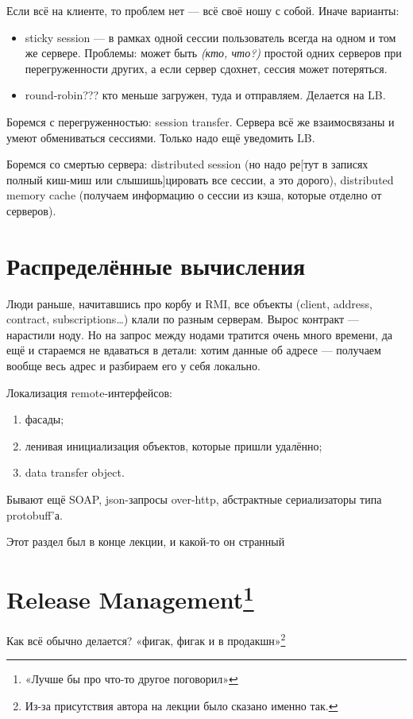 \documentclass[11pt,a4paper]{article}
\begin{document}
Если всё на клиенте, то проблем нет — всё своё ношу с собой. Иначе варианты:
\begin{itemize}
\item sticky session — в рамках одной сессии пользователь всегда на одном и том же сервере. Проблемы: может быть \textit{(кто, что?)} простой одних серверов при перегруженности других, а если сервер сдохнет, сессия может потеряться.
\item round-robin??? кто меньше загружен, туда и отправляем. Делается на LB.
\end{itemize}

Боремся с перегруженностью: session transfer. Сервера всё же взаимосвязаны и умеют обмениваться сессиями. Только надо ещё уведомить LB.

Боремся со смертью сервера: distributed session (но надо ре[тут в записях полный киш-миш или слышишь]цировать все сессии, а это дорого), distributed memory cache (получаем информацию о сессии из кэша, которые отделно от серверов).

\section{Распределённые вычисления}
Люди раньше, начитавшись про корбу и RMI, все объекты (client, address, contract, subscriptions…) клали по разным серверам. Вырос контракт — нарастили ноду. Но на запрос между нодами тратится очень много времени, да ещё и стараемся не вдаваться в детали: хотим данные об адресе — получаем вообще весь адрес и разбираем его у себя локально.

Локализация remote-интерфейсов:
\begin{enumerate}
\item фасады;
\item ленивая инициализация объектов, которые пришли удалённо;
\item data transfer object.
\end{enumerate}

Бывают ещё SOAP, json-запросы over-http, абстрактные сериализаторы типа protobuff'а.

Этот раздел был в конце лекции, и какой-то он странный

\section{Release Management\footnote{«Лучше бы про что-то другое поговорил»}}
Как всё обычно делается? «фигак, фигак и в продакшн»\footnote{Из-за присутствия автора на лекции было сказано именно так.}
\end{document}
